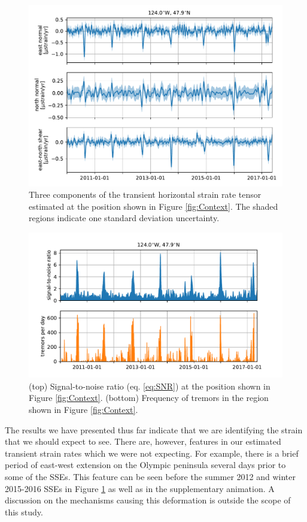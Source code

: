 \documentclass[extra,mreferee]{gji}
\begin{document}
\begin{figure}
\includegraphics{figures/strain_ts/strain-ts.pdf}
\caption{Three components of the transient horizontal strain rate tensor estimated at the position shown in Figure \ref{fig:Context}. The shaded regions indicate one standard deviation uncertainty.}   
\label{fig:StrainTs}
\end{figure}

\begin{figure}
\includegraphics{figures/strain_ts/mag-ts.pdf}
\caption{(top) Signal-to-noise ratio (eq. \ref{eq:SNR}) at the position shown in Figure \ref{fig:Context}. (bottom) Frequency of tremors in the region shown in Figure \ref{fig:Context}.}   
\label{fig:StrainMag}
\end{figure}

The results we have presented thus far indicate that we are identifying the strain that we should expect to see. There are, however, features in our estimated transient strain rates which we were not expecting. For example, there is a brief period of east-west extension on the Olympic peninsula several days prior to some of the SSEs. This feature can be seen before the summer 2012 and winter 2015-2016 SSEs in Figure \ref{fig:StrainTs} as well as in the supplementary animation. A discussion on the mechanisms causing this deformation is outside the scope of this study.
\end{document}
